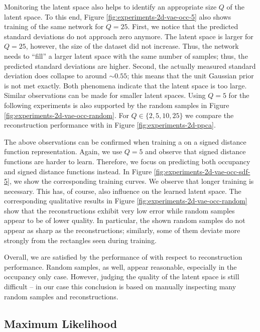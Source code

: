 Monitoring the latent space also helps to identify an appropriate
size $Q$ of the latent space. To this end, Figure \ref{fig:experiments-2d-vae-occ-5}
also shows training of the same network for $Q = 25$. First, we notice that the
predicted standard deviations do not approach zero anymore. The latent
space is larger for $Q = 25$, however, the size of the dataset did not increase.
Thus, the network needs to ``fill'' a larger latent space with the same number of samples;
thus, the predicted standard deviations are higher. Second, the actually measured
standard deviation does collapse to around $\sim 0.55$; this means that
the unit Gaussian prior is not met exactly. Both phenomena indicate that the latent
space is too large. Similar observations can be made for smaller latent spaces.
Using $Q = 5$ for the following experiments is also supported by
the random samples in Figure \ref{fig:experiments-2d-vae-occ-random}.
For $Q \in \{2, 5, 10, 25\}$ we compare the reconstruction performance with
\PPCA in Figure \ref{fig:experiments-2d-ppca}.



The above observations can be confirmed when training a \VAE on a signed
distance function representation. Again, we use $Q = 5$ and observe that
signed distance functions are harder to learn. Therefore,
we focus on predicting both occupancy and
signed distance functions instead. In Figure \ref{fig:experiments-2d-vae-occ-sdf-5},
we show the corresponding training curves. We observe that longer training
is necessary. This has, of course,
also influence on the learned latent space. The corresponding
qualitative results in Figure \ref{fig:experiments-2d-vae-occ-random}
show that the reconstructions exhibit very low error while random samples
appear to be of lower quality. In particular, the shown random samples do not appear
as sharp as the reconstructions; similarly, some of them deviate more strongly
from the rectangles seen during training.

Overall, we are satisfied by the performance of \VAEs with respect to reconstruction performance. Random samples, as well, appear reasonable, especially in the occupancy
only case. However, judging the quality of the latent space is still difficult
-- in our case this conclusion is based on manually inspecting many random
samples and reconstructions.

\subsection{Maximum Likelihood}

